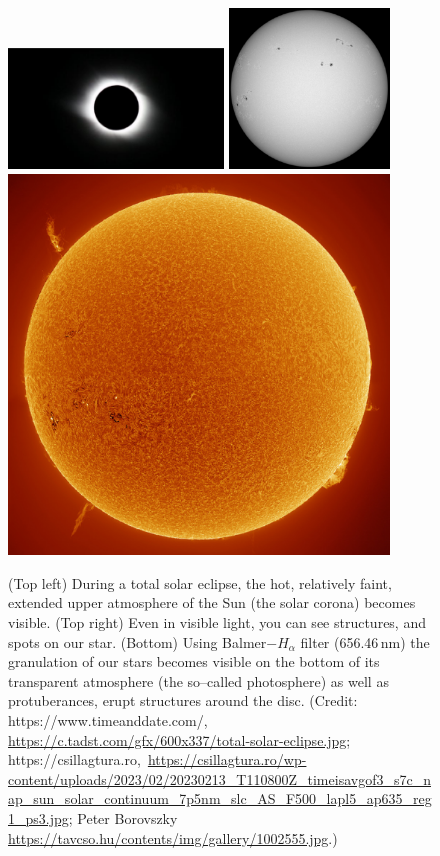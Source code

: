 \documentclass[sn-aps]{sn-jnl}%
\begin{document}
\begin{figure}[t]
\centering
\includegraphics[width=0.51\textwidth]{facsko_iccecip2022-f01a.eps}
\includegraphics[width=0.38\textwidth]{facsko_iccecip2022-f01b.eps}
\includegraphics[width=0.9\textwidth]{facsko_iccecip2022-f01c.eps}
\caption{(Top left) During a total solar eclipse, the hot, relatively faint, extended upper atmosphere of the Sun (the solar corona) becomes visible. (Top right) Even in visible light, you can see structures, and spots on our star. (Bottom) Using Balmer$-H_{\alpha}$ filter (656.46\,nm) the granulation of our stars becomes visible on the bottom of its transparent atmosphere (the so--called photosphere) as well as protuberances, erupt structures around the disc. (Credit: https://www.timeanddate.com/, \url{https://c.tadst.com/gfx/600x337/total-solar-eclipse.jpg}; https://csillagtura.ro,~\url{https://csillagtura.ro/wp-content/uploads/2023/02/20230213_T110800Z_timeisavgof3_s7c_nap_sun_solar_continuum_7p5nm_slc_AS_F500_lapl5_ap635_reg1_ps3.jpg}; Peter Borovszky \url{https://tavcso.hu/contents/img/gallery/1002555.jpg}.)}\label{fig:sunvisible}
\end{figure}
\end{document}
